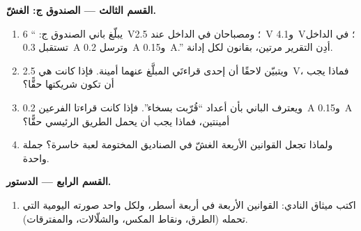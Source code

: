 \begin{problem}
\medskip\noindent\textbf{القسم الثالث --- الصندوق ج: الغشّ.}
\begin{enumerate}[resume]
  \item يبلّغ باني الصندوق ج: `` \qty{6}{V}؛
        ومصباحان  في الداخل عند \qty{2.5}{V}
        و\qty{4.1}{V}؛  في الداخل تستقبل \qty{0.3}{A}
        وترسل \qty{0.2}{A} و\qty{0.15}{A}.'' أدِن التقرير
        مرتين، بقانون لكل إدانة.
  \item ويتبيّن لاحقًا أن إحدى قراءتَي  المبلَّغ عنهما
        أمينة. فإذا كانت هي \qty{2.5}{V}، فماذا يجب أن تكون
        شريكتها حقًّا؟
  \item ويعترف الباني بأن أعداد  ``قُرّبت بسخاء''. فإذا
        كانت قراءتا الفرعين \qty{0.2}{A} و\qty{0.15}{A}
        أمينتين، فماذا يجب أن يحمل الطريق الرئيسي حقًّا؟
  \item ولماذا تجعل القوانين الأربعة الغشّ في الصناديق
        المختومة لعبة خاسرة؟ جملة واحدة.
\end{enumerate}

\medskip\noindent\textbf{القسم الرابع --- الدستور.}
\begin{enumerate}[resume]
  \item اكتب ميثاق النادي: القوانين الأربعة في أربعة أسطر،
        ولكل واحد صورته اليومية التي تحمله (الطرق، ونقاط
        المكس، والشلّالات، والمفترقات).
\end{enumerate}
\end{problem}
